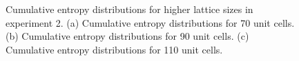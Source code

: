 \documentclass[10pt]{revtex4-1}
\newcommand\SSHTwoCumulativeEntropyOneFourZero{./supp_ssh2_140_plot_cumulative_feature_importances.png}
\newcommand\SSHTwoCumulativeEntropyOneEightZero{./supp_ssh2_180_plot_cumulative_feature_importances.png}
\newcommand\SSHTwoCumulativeEntropyTwoTwoZero{./supp_ssh2_220_plot_cumulative_feature_importances.png}
\begin{document}
\begin{figure}
\centering
{}
\caption{Cumulative entropy distributions for higher lattice sizes in experiment 2. (a) Cumulative entropy distributions for 70 unit cells. (b) Cumulative entropy distributions for 90 unit cells. (c) Cumulative entropy distributions for 110 unit cells.}
\label{cdf2}
\end{figure}
\end{document}
